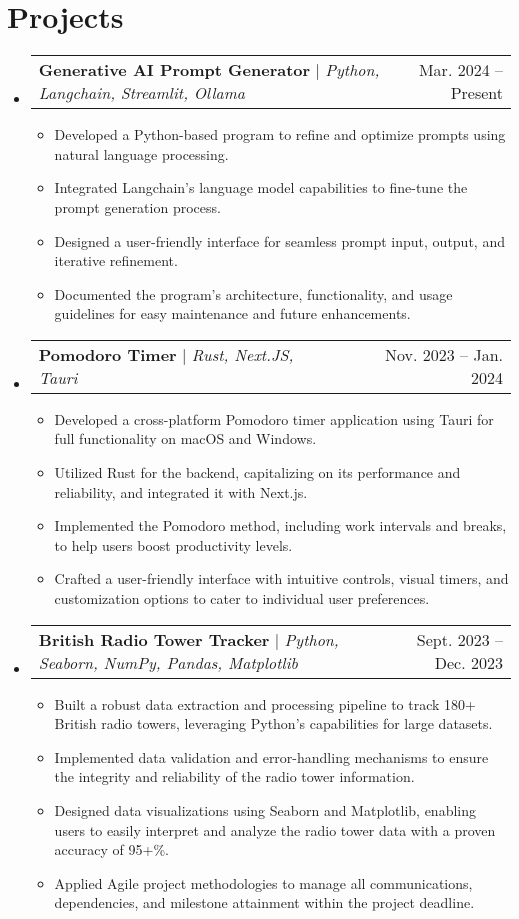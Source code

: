 \documentclass[letterpaper,11pt]{article}
\makeatletter
\newcommand{\resumeItem}[1]{
  \item\small{
    {#1 \vspace{-2pt}}
  }
}
\newcommand{\resumeProjectHeading}[2]{
    \item
    \begin{tabular*}{0.97\textwidth}{l@{\extracolsep{\fill}}r}
      \small#1 & #2 \\
    \end{tabular*}\vspace{-7pt}
}
\newcommand{\resumeSubHeadingListStart}{\begin{itemize}[leftmargin=0.15in, label={}]}
\newcommand{\resumeSubHeadingListEnd}{\end{itemize}}
\newcommand{\resumeItemListStart}{\begin{itemize}}
\newcommand{\resumeItemListEnd}{\end{itemize}\vspace{-5pt}}
\makeatother
\begin{document}
\section{Projects}
    \resumeSubHeadingListStart
      \resumeProjectHeading
          {\textbf{Generative AI Prompt Generator} $|$ \emph{Python, Langchain, Streamlit, Ollama}}{Mar. 2024 -- Present}
          \resumeItemListStart
            \resumeItem{Developed a Python-based program to refine and optimize prompts using natural language processing.}
            \resumeItem{Integrated Langchain's language model capabilities to fine-tune the prompt generation process.}
            \resumeItem{Designed a user-friendly interface for seamless prompt input, output, and iterative refinement.}
            \resumeItem{Documented the program's architecture, functionality, and usage guidelines for easy maintenance and future enhancements.}
          \resumeItemListEnd
      \resumeProjectHeading
          {\textbf{Pomodoro Timer} $|$ \emph{Rust, Next.JS, Tauri}}{Nov. 2023 -- Jan. 2024}
          \resumeItemListStart
            \resumeItem{Developed a cross-platform Pomodoro timer application using Tauri for full functionality on macOS and Windows.}
            \resumeItem{Utilized Rust for the backend, capitalizing on its performance and reliability, and integrated it with Next.js.}
            \resumeItem{Implemented the Pomodoro method, including work intervals and breaks, to help users boost productivity levels.}
            \resumeItem{Crafted a user-friendly interface with intuitive controls, visual timers, and customization options to cater to individual user preferences.}
          \resumeItemListEnd
          \resumeProjectHeading
          {\textbf{British Radio Tower Tracker} $|$ \emph{Python, Seaborn, NumPy, Pandas, Matplotlib}}{Sept. 2023 -- Dec. 2023}
          \resumeItemListStart
          \resumeItem{Built a robust data extraction and processing pipeline to track 180+ British radio towers, leveraging Python's capabilities for large datasets.}
          \resumeItem{Implemented data validation and error-handling mechanisms to ensure the integrity and reliability of the radio tower information.}
          \resumeItem{Designed data visualizations using Seaborn and Matplotlib, enabling users to easily interpret and analyze the radio tower data with a proven accuracy of 95+\%.}
          \resumeItem{Applied Agile project methodologies to manage all communications, dependencies, and milestone attainment within the project deadline.}
          \resumeItemListEnd
          \resumeSubHeadingListEnd
          
\end{document}
